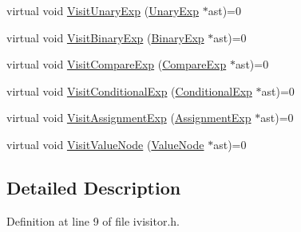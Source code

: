 \begin{DoxyCompactItemize}
\item 
virtual void \hyperlink{classmocha_1_1_i_visitor_a86fd623e2dd4eb4dab0f9f6bd15ef791}{VisitUnaryExp} (\hyperlink{classmocha_1_1_unary_exp}{UnaryExp} $\ast$ast)=0
\item 
virtual void \hyperlink{classmocha_1_1_i_visitor_ae37a191483dafb6dbe6c5ef8c4bcdd59}{VisitBinaryExp} (\hyperlink{classmocha_1_1_binary_exp}{BinaryExp} $\ast$ast)=0
\item 
virtual void \hyperlink{classmocha_1_1_i_visitor_ae07262be8e2fecbf3ccc361c953edebc}{VisitCompareExp} (\hyperlink{classmocha_1_1_compare_exp}{CompareExp} $\ast$ast)=0
\item 
virtual void \hyperlink{classmocha_1_1_i_visitor_a43d7ed9c33c73e6bacaa4de12633094d}{VisitConditionalExp} (\hyperlink{classmocha_1_1_conditional_exp}{ConditionalExp} $\ast$ast)=0
\item 
virtual void \hyperlink{classmocha_1_1_i_visitor_a5eb58942f50a383a2d3a8b792252963c}{VisitAssignmentExp} (\hyperlink{classmocha_1_1_assignment_exp}{AssignmentExp} $\ast$ast)=0
\item 
virtual void \hyperlink{classmocha_1_1_i_visitor_abb302899c977c0e288bac7f224c92c0e}{VisitValueNode} (\hyperlink{classmocha_1_1_value_node}{ValueNode} $\ast$ast)=0
\end{DoxyCompactItemize}


\subsection{Detailed Description}


Definition at line 9 of file ivisitor.h.



